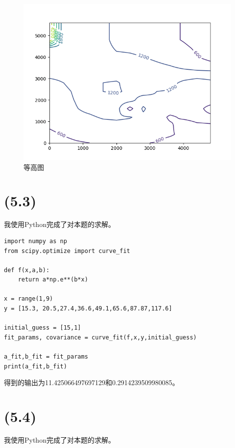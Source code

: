 \documentclass[a4paper]{article}
\begin{document}
\begin{figure}[!h]
    \centering
    \includegraphics[width=\textwidth]{Figure_1.png}
    \caption{等高图}
\end{figure}
\newpage
\section{(5.3)}
我使用Python完成了对本题的求解。
\begin{lstlisting}[emph={[3]columns,index,kind,inline,fontsize,x,y,a,b},emphstyle={[3]\color{vscode_parametercolor}},emph={[4]SearchProblem,Callable,Node,Reached,Any,Tuple,List,FoodSearchProblem},emphstyle={[4]\color{vscode_classcolor}}]
import numpy as np
from scipy.optimize import curve_fit

def f(x,a,b):
    return a*np.e**(b*x)

x = range(1,9)
y = [15.3, 20.5,27.4,36.6,49.1,65.6,87.87,117.6]

initial_guess = [15,1]
fit_params, covariance = curve_fit(f,x,y,initial_guess)

a_fit,b_fit = fit_params
print(a_fit,b_fit)
\end{lstlisting}
得到的输出为11.425066497697129和0.2914239509980085。
\newpage
\section{(5.4)}
我使用Python完成了对本题的求解。
\end{document}
